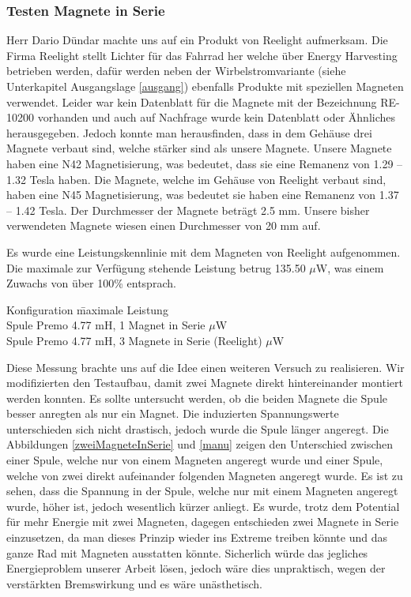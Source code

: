 \subsubsection{Testen Magnete in Serie}

Herr Dario Dündar machte uns auf ein Produkt von Reelight aufmerksam. Die Firma Reelight stellt Lichter für das Fahrrad her welche über Energy Harvesting betrieben werden, dafür werden neben der Wirbelstromvariante (siehe Unterkapitel Ausgangslage \ref{ausgang}) ebenfalls Produkte mit speziellen Magneten verwendet. Leider war kein Datenblatt für die Magnete mit der Bezeichnung RE-10200 vorhanden und auch auf Nachfrage wurde kein Datenblatt oder Ähnliches herausgegeben. Jedoch konnte man herausfinden, dass in dem Gehäuse drei Magnete verbaut sind, welche stärker sind als unsere Magnete. Unsere Magnete haben eine N42 Magnetisierung, was bedeutet, dass sie eine Remanenz von 1.29 – 1.32 Tesla haben. Die Magnete, welche im Gehäuse von Reelight verbaut sind, haben eine N45 Magnetisierung, was bedeutet sie haben eine Remanenz von 1.37 – 1.42 Tesla. Der Durchmesser der Magnete beträgt 2.5 mm. Unsere bisher verwendeten Magnete wiesen einen Durchmesser von 20 mm auf. 

Es wurde eine Leistungskennlinie mit dem Magneten von Reelight aufgenommen. Die maximale zur Verfügung stehende Leistung betrug 135.50 $\mu$W, was einem Zuwachs von über 100\thinspace\% entsprach.

\begin{tabbing}
    Konfiguration\hphantom{4.77 mH, 3 Magnete in Serie (Reelight)}   \quad\= maximale Leistung    \\[0.8ex]
    Spule Premo 4.77 mH, 1 Magnet in Serie         $\mu$W\\
	Spule Premo 4.77 mH, 3 Magnete in Serie (Reelight)         $\mu$W
\end{tabbing}

Diese Messung brachte uns auf die Idee einen weiteren Versuch zu realisieren. Wir modifizierten den Testaufbau, damit zwei Magnete direkt hintereinander montiert werden konnten. Es sollte untersucht werden, ob die beiden Magnete die Spule besser anregten als nur ein Magnet. Die induzierten Spannungswerte unterschieden sich nicht drastisch, jedoch wurde die Spule länger angeregt. Die Abbildungen \ref{zweiMagneteInSerie} und \ref{manu} zeigen den Unterschied zwischen einer Spule, welche nur von einem Magneten angeregt wurde und einer Spule, welche von zwei direkt aufeinander folgenden Magneten angeregt wurde. Es ist zu sehen, dass die Spannung in der Spule, welche nur mit einem Magneten angeregt wurde, höher ist, jedoch wesentlich kürzer anliegt. Es wurde, trotz dem Potential für mehr Energie mit zwei Magneten, dagegen entschieden zwei Magnete in Serie einzusetzen, da man dieses Prinzip wieder ins Extreme treiben könnte und das ganze Rad mit Magneten ausstatten könnte. Sicherlich würde das jegliches Energieproblem unserer Arbeit lösen, jedoch wäre dies unpraktisch, wegen der verstärkten Bremswirkung und es wäre unästhetisch.

